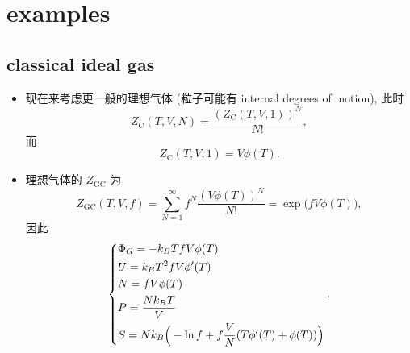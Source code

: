 \section{examples}
\subsection{classical ideal gas}
\begin{itemize}
	\item 现在来考虑更一般的理想气体 (粒子可能有 internal degrees of motion), 此时
	\begin{equation}
		Z_\text{C}(T, V, N) = \frac{(Z_\text{C}(T, V, 1))^N}{N!},
	\end{equation}
	而
	\begin{equation}
		Z_\text{C}(T, V, 1) = V \phi(T).
	\end{equation}
	
	\item 理想气体的 $Z_\text{GC}$ 为
	\begin{equation}
		Z_\text{GC}(T, V, f) = \sum_{N = 1}^\infty f^N \frac{(V \phi(T))^N}{N!} = \exp \Big( f V \phi(T) \Big),
	\end{equation}
	因此
	\begin{equation} \label{4.5.4}
		\begin{dcases}
			\Phi_G = - k_B T f V \phi(T) \\
			U = k_B T^2 f V \phi'(T) \\
			N = f V \phi(T) \\
			P = \frac{N k_B T}{V} \\
			S = N k_B \Big( - \ln f + f \frac{V}{N} (T \phi'(T) + \phi(T)) \Big)
		\end{dcases}.
	\end{equation}
\end{itemize}

